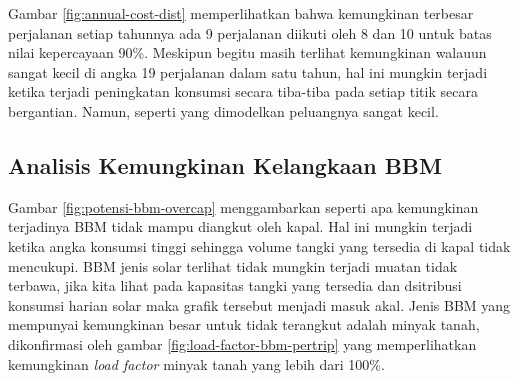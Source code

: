 Gambar \ref{fig:annual-cost-dist} memperlihatkan bahwa kemungkinan terbesar perjalanan setiap tahunnya ada 9 perjalanan diikuti oleh 8 dan 10 untuk batas nilai kepercayaan 90\%. Meskipun begitu masih terlihat kemungkinan walauun sangat kecil di angka 19 perjalanan dalam satu tahun, hal ini mungkin terjadi ketika terjadi peningkatan konsumsi secara tiba-tiba pada setiap titik secara bergantian. Namun, seperti yang dimodelkan peluangnya sangat kecil.


\subsection{Analisis Kemungkinan Kelangkaan BBM}
\label{subsec:stock-out-over-capacity}

Gambar \ref{fig:potensi-bbm-overcap} menggambarkan seperti apa kemungkinan terjadinya BBM tidak mampu diangkut oleh kapal. Hal ini mungkin terjadi ketika angka konsumsi tinggi sehingga volume tangki yang tersedia di kapal tidak mencukupi. BBM jenis solar terlihat tidak mungkin terjadi muatan tidak terbawa, jika kita lihat pada kapasitas tangki yang tersedia dan dsitribusi konsumsi harian solar maka grafik tersebut menjadi masuk akal. Jenis BBM yang mempunyai kemungkinan besar untuk tidak terangkut adalah minyak tanah, dikonfirmasi oleh gambar \ref{fig:load-factor-bbm-pertrip} yang memperlihatkan kemungkinan \emph{load factor} minyak tanah yang lebih dari 100\%.

